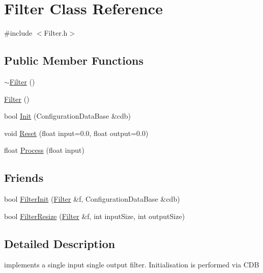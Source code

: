 \hypertarget{classFilter}{
\section{Filter Class Reference}
\label{classFilter}
}


{\ttfamily \#include $<$Filter.h$>$}

\subsection*{Public Member Functions}
\begin{DoxyCompactItemize}
\item 
\hyperlink{classFilter_a502ee334d42eac3edbaf32b599f9c35e}{$\sim$Filter} ()
\item 
\hyperlink{classFilter_ad15994c30d497afd567a6445446a249e}{Filter} ()
\item 
bool \hyperlink{classFilter_a263b709bcb913eb32cbfd1fc16a2366e}{Init} (ConfigurationDataBase \&cdb)
\item 
void \hyperlink{classFilter_a1c94aa934f9c9af784ff08ea0318f66b}{Reset} (float input=0.0, float output=0.0)
\item 
float \hyperlink{classFilter_a2d6f2a0b780dc773c963b041606c99ab}{Process} (float input)
\end{DoxyCompactItemize}
\subsection*{Friends}
\begin{DoxyCompactItemize}
\item 
bool \hyperlink{classFilter_a228905a165c62822dc1f87333293ba2e}{FilterInit} (\hyperlink{classFilter}{Filter} \&f, ConfigurationDataBase \&cdb)
\item 
bool \hyperlink{classFilter_ab0da466039250753f8c6c878c4f4cdac}{FilterResize} (\hyperlink{classFilter}{Filter} \&f, int inputSize, int outputSize)
\end{DoxyCompactItemize}


\subsection{Detailed Description}
implements a single input single output filter. Initialisation is performed via CDB 

